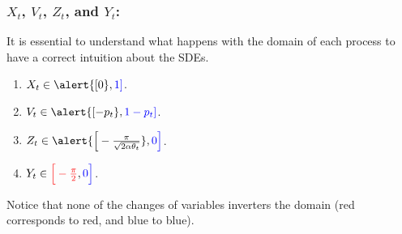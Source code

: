 \documentclass[aspectratio=169]{beamer}\usepackage[utf8]{inputenc}
\begin{document}
\begin{frame}\frametitle{$X_t$, $V_t$, $Z_t$, and $Y_t$:}

It is essential to understand what happens with the domain of each process to have a correct intuition about the SDEs.

\begin{enumerate}
\item $X_t\in\alert{[0},{\color{blue}1]}$.
\item $V_t\in\alert{[-p_t},{\color{blue}1-p_t]}$.
\item $Z_t\in\alert{\Big[-\frac{\pi}{\sqrt{2\alpha\theta_t}}},{\color{blue}0\Big]}$.
\item $Y_t\in{\color{red}\Big[-\frac{\pi}{2}},{\color{blue}0\Big]}$.
\end{enumerate}
Notice that none of the changes of variables inverters the domain (red corresponds to red, and blue to blue).

\end{frame}
\end{document}
